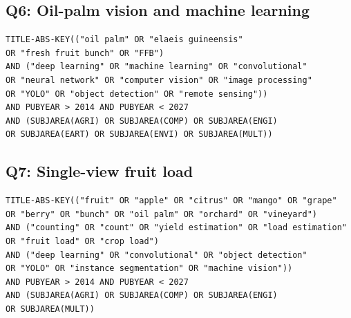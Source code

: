 \subsection*{Q6: Oil-palm vision and machine learning}
\begin{verbatim}
TITLE-ABS-KEY(("oil palm" OR "elaeis guineensis"
OR "fresh fruit bunch" OR "FFB")
AND ("deep learning" OR "machine learning" OR "convolutional"
OR "neural network" OR "computer vision" OR "image processing"
OR "YOLO" OR "object detection" OR "remote sensing"))
AND PUBYEAR > 2014 AND PUBYEAR < 2027
AND (SUBJAREA(AGRI) OR SUBJAREA(COMP) OR SUBJAREA(ENGI)
OR SUBJAREA(EART) OR SUBJAREA(ENVI) OR SUBJAREA(MULT))
\end{verbatim}

\subsection*{Q7: Single-view fruit load}
\begin{verbatim}
TITLE-ABS-KEY(("fruit" OR "apple" OR "citrus" OR "mango" OR "grape"
OR "berry" OR "bunch" OR "oil palm" OR "orchard" OR "vineyard")
AND ("counting" OR "count" OR "yield estimation" OR "load estimation"
OR "fruit load" OR "crop load")
AND ("deep learning" OR "convolutional" OR "object detection"
OR "YOLO" OR "instance segmentation" OR "machine vision"))
AND PUBYEAR > 2014 AND PUBYEAR < 2027
AND (SUBJAREA(AGRI) OR SUBJAREA(COMP) OR SUBJAREA(ENGI)
OR SUBJAREA(MULT))
\end{verbatim}
